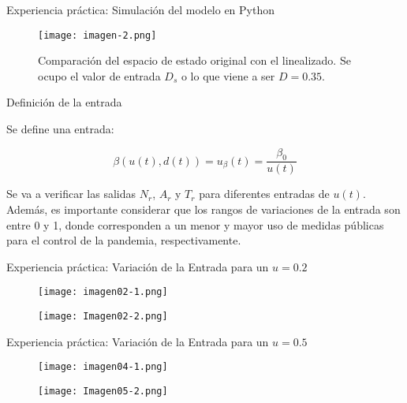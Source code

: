 \documentclass{beamer}
\begin{document}
\begin{frame}{Experiencia práctica: Simulación del modelo en Python}
\begin{justify}
\small

\begin{figure}[H]
\centering
\texttt{[image: imagen-2.png]}
\captionsetup{justification=centering}
\caption{Comparación del espacio de estado original con el linealizado. Se ocupo el valor de entrada $D_s$ o lo que viene a ser $D=0.35$.}
\label{C2}
\end{figure}

\end{justify}
\end{frame}

\begin{frame}{Definición de la entrada}
\begin{justify}
Se define una entrada: 

$$\beta(u(t), d(t)) = u_{\beta}(t) = \frac{\beta_0}{u(t)}$$ 

\vspace{0.3cm}
Se va a verificar las salidas $N_r$, $A_r$ y $T_r$ para diferentes entradas de $u(t)$. Además, es importante considerar que los rangos de variaciones de la entrada son entre 0 y 1, donde corresponden a un menor y mayor uso de medidas públicas para el control de la pandemia, respectivamente.

\end{justify}
\end{frame}


\begin{frame}{Experiencia práctica: Variación de la Entrada para un $u=0.2$}
\begin{justify}
\small
{\footnotesize
\begin{figure}[H]
\centering
\texttt{[image: imagen02-1.png]}
\captionsetup{justification=centering}
\label{C2}
\end{figure}

\begin{figure}[H]
\centering
\texttt{[image: Imagen02-2.png]}
\captionsetup{justification=centering}
\label{C2}
\end{figure}
}
\end{justify}
\end{frame}



\begin{frame}{Experiencia práctica: Variación de la Entrada para un $u=0.5$}
\begin{justify}
\small
{\footnotesize
\begin{figure}[H]
\centering
\texttt{[image: imagen04-1.png]}
\captionsetup{justification=centering}
\label{C2}
\end{figure}

\begin{figure}[H]
\centering
\texttt{[image: Imagen05-2.png]}
\captionsetup{justification=centering}
\label{C2}
\end{figure}
}
\end{justify}
\end{frame}
\end{document}
